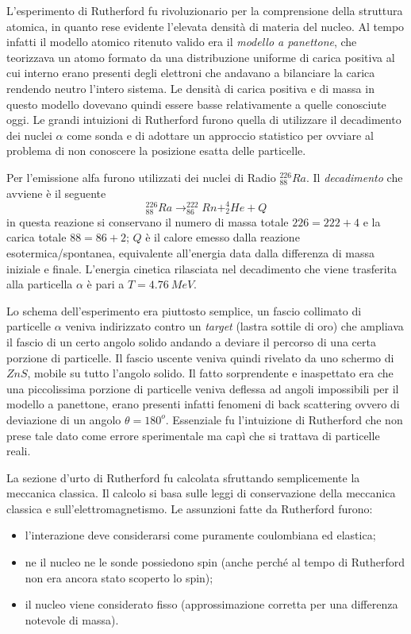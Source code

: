 L'esperimento di Rutherford fu rivoluzionario per la comprensione della struttura atomica, in quanto rese evidente l'elevata densità di materia del nucleo.
Al tempo infatti il modello atomico ritenuto valido era il \emph{modello a panettone}, che teorizzava un atomo formato da una distribuzione uniforme di carica positiva al cui interno erano presenti degli elettroni che andavano a bilanciare la carica rendendo neutro l'intero sistema.
Le densità di carica positiva e di massa in questo modello dovevano quindi essere basse relativamente a quelle conosciute oggi.
Le grandi intuizioni di Rutherford furono quella di utilizzare il decadimento dei nuclei $\alpha$ come sonda e di adottare un approccio statistico per ovviare al problema di non conoscere la posizione esatta delle particelle.

Per l'emissione alfa furono utilizzati dei nuclei di Radio $^{226}_{88} Ra$.
Il \emph{decadimento} che avviene è il seguente
\begin{equation}
^{226}_{88} Ra \longrightarrow ^{222}_{86}Rn + ^{4}_{2}He + Q
\end{equation}
in questa reazione si conservano il numero di massa totale $ 226 = 222 + 4 $ e la carica totale $ 88 = 86 + 2 $;
$Q$ è il calore emesso dalla reazione esotermica/spontanea, equivalente all'energia data dalla differenza di massa iniziale e finale. 
L'energia cinetica rilasciata nel decadimento che viene trasferita alla particella $\alpha$ è pari a $T = \SI{4.76}{MeV}$.

Lo schema dell'esperimento era piuttosto semplice, un fascio collimato di particelle $\alpha$ veniva indirizzato contro un \emph{target} (lastra sottile di oro) che ampliava il fascio di un certo angolo solido andando a deviare il percorso di una certa porzione di particelle. 
Il fascio uscente veniva quindi rivelato da uno schermo di $ZnS$, mobile su tutto l'angolo solido.
Il fatto sorprendente e inaspettato era che una piccolissima porzione di particelle veniva deflessa ad angoli impossibili per il modello a panettone, erano presenti infatti fenomeni di back scattering ovvero di deviazione di un angolo $\theta=180^o$.
Essenziale fu l'intuizione di Rutherford che non prese tale dato come errore sperimentale ma capì che si trattava di particelle reali.

La sezione d'urto di Rutherford fu calcolata sfruttando semplicemente la meccanica classica. 
Il calcolo si basa sulle leggi di conservazione della meccanica classica e sull'elettromagnetismo. 
Le assunzioni fatte da Rutherford furono:
\begin{itemize}
\item l'interazione deve considerarsi come puramente coulombiana ed elastica;
\item ne il nucleo ne le sonde possiedono spin (anche perché al tempo di Rutherford non era ancora stato scoperto lo spin);
\item il nucleo viene considerato fisso (approssimazione corretta per una differenza notevole di massa).
\end{itemize}

